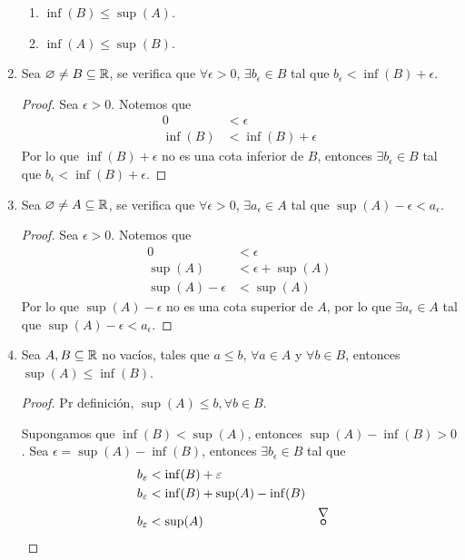 \begin{enumerate}[label=\roman*)]
  \begin{enumerate}[label=\roman*)]
  \item $\inf (B) \leq \sup (A)$.
  \item $\inf (A) \leq \sup (B)$.
  \end{enumerate}
  \item Sea $\varnothing \neq B\subseteq \mathbb{R}$, se verifica que $\forall \epsilon > 0$, $\exists b_\epsilon\in B$ tal que $b_\epsilon < \inf (B) + \epsilon$.
  
  \begin{proof}\leavevmode
    Sea $\epsilon >0$. Notemos que
    \begin{align*}
      0 &< \epsilon\\
      \inf (B) &< \inf (B) + \epsilon
    \end{align*}
    Por lo que $\inf (B) +\epsilon$ no es una cota inferior de $B$, entonces $\exists b_\epsilon\in B$ tal que $b_\epsilon < \inf (B) + \epsilon$.
  \end{proof}
  
  \item Sea $\varnothing \neq A\subseteq \mathbb{R}$, se verifica que $\forall \epsilon > 0$, $\exists a_\epsilon\in A$ tal que $\sup (A) - \epsilon < a_\epsilon$.
  \begin{proof}\leavevmode
    Sea $\epsilon>0$. Notemos que 
    \begin{align*}
      0 &< \epsilon\\
      \sup (A) &< \epsilon + \sup (A)\\
      \sup (A) - \epsilon &< \sup (A)
    \end{align*}
    Por lo que $\sup (A)-\epsilon$ no es una cota superior de $A$, por lo que $\exists a_\epsilon\in A$ tal que $\sup (A) - \epsilon < a_\epsilon$.
  \end{proof}
  
  \item Sea $A, B\subseteq \mathbb{R}$ no vacíos, tales que $a\leq b$, $\forall a\in A$ y $\forall b\in B$, entonces $\sup(A)\leq \inf(B)$.
  
  \begin{proof}\leavevmode
    
  Pr definición, $\sup (A) \leq b, \forall b\in B$.
  
  Supongamos que $\inf(B) < \sup(A)$, entonces $\sup(A) - \inf(B) > 0$. Sea $\epsilon = \sup(A) - \inf(B)$, entonces $\exists b_\epsilon\in B$ tal que
    \begin{align*}
      b_\epsilon &< \inf(B) + \epsilon\\
      b_\epsilon &< \inf(B) + \sup(A) - \inf(B)\\
      b_\epsilon &< \sup(A) && \contradiction
    \end{align*}
  \end{proof}
  
\end{enumerate}